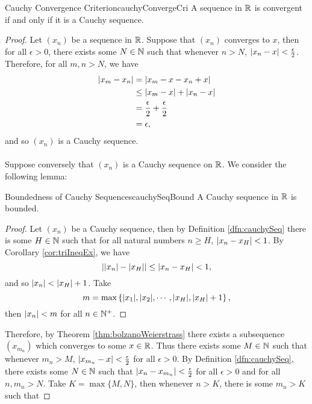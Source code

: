 \documentclass[math]{amznotes}
\theoremstyle{remark}
\begin{document}
\begin{thmbox}{Cauchy Convergence Criterion}{cauchyConvergeCri}
    A sequence in $\mathbb{R}$ is convergent if and only if it is a Cauchy sequence.
    \tcblower
    \begin{proof}
        Let $(x_n)$ be a sequence in $\mathbb{R}$. Suppose that $(x_n)$ converges to $x$, then for all $\epsilon > 0$, there exists some $N \in \mathbb{N}$ such that whenever $n > N$, ${\left\lvert {x_n - x} \right\rvert} < \frac{\epsilon}{2}$. Therefore, for all $m, n > N$, we have
        \begin{align*}
            {\left\lvert {x_m - x_n} \right\rvert} & = {\left\lvert {x_m - x - x_n + x} \right\rvert} \\
            & \leq {\left\lvert {x_m - x} \right\rvert} + {\left\lvert {x_n - x} \right\rvert} \\
            & = \frac{\epsilon}{2} + \frac{\epsilon}{2} \\
            & = \epsilon,
        \end{align*}
        and so $(x_n)$ is a Cauchy sequence.
        \\\\
        Suppose conversely that $(x_n)$ is a Cauchy sequence on $\mathbb{R}$. We consider the following lemma:
        \begin{lembox}{Boundedness of Cauchy Sequences}{cauchySeqBound}
            A Cauchy sequence in $\mathbb{R}$ is bounded.
            \tcblower
            \begin{proof}
                Let $(x_n)$ be a Cauchy sequence, then by Definition \ref{dfn:cauchySeq} there is some $H \in \mathbb{N}$ such that for all natural numbers $n \geq H$, ${\left\lvert {x_n - x_H} \right\rvert} < 1$. By Corollary \ref{cor:triIneqEx}, we have
                \begin{equation*}
                    {\left\lvert {{\left\lvert {x_n} \right\rvert} - {\left\lvert {x_H} \right\rvert}} \right\rvert} \leq {\left\lvert {x_n - x_H} \right\rvert} < 1,
                \end{equation*}
                and so ${\left\lvert {x_n} \right\rvert} < {\left\lvert {x_H} \right\rvert} + 1$. Take 
                \begin{equation*}
                    m = \max\left\{{\left\lvert {x_1} \right\rvert}, {\left\lvert {x_2} \right\rvert}, \cdots, {\left\lvert {x_H} \right\rvert}, {\left\lvert {x_H} \right\rvert} + 1\right\},
                \end{equation*}
                then ${\left\lvert {x_n} \right\rvert} < m$ for all $n \in \mathbb{N}^+$.
            \end{proof}
        \end{lembox}
        Therefore, by Theorem \ref{thm:bolzanoWeierstrass} there exists a subsequence $(x_{m_n})$ which converges to some $x \in \mathbb{R}$. Thus there exists some $M \in \mathbb{N}$ such that whenever $m_{n} > M$, ${\left\lvert {x_{m_n} - x} \right\rvert} < \frac{\epsilon}{2}$ for all $\epsilon > 0$. By Definition \ref{dfn:cauchySeq}, there exists some $N \in \mathbb{N}$ such that ${\left\lvert {x_n - x_{m_n}} \right\rvert} < \frac{\epsilon}{2}$ for all $\epsilon > 0$ and for all $n, m_n > N$. Take $K = \max\{M, N\}$, then whenever $n > K$, there is some $m_n > K$ such that

\end{proof}
\end{thmbox}
\end{document}
